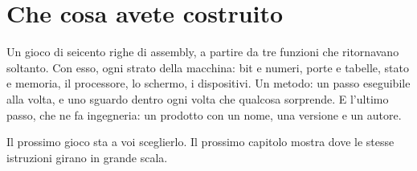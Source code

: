 \section{Che cosa avete costruito}

Un gioco di seicento righe di assembly, a partire da tre funzioni che
ritornavano soltanto. Con esso, ogni strato della macchina: bit e numeri, porte
e tabelle, stato e memoria, il processore, lo schermo, i dispositivi. Un
metodo: un passo eseguibile alla volta, e uno sguardo dentro ogni volta che
qualcosa sorprende. E l'ultimo passo, che ne fa ingegneria: un prodotto con un
nome, una versione e un autore.

Il prossimo gioco sta a voi sceglierlo. Il prossimo capitolo mostra dove le
stesse istruzioni girano in grande scala.
